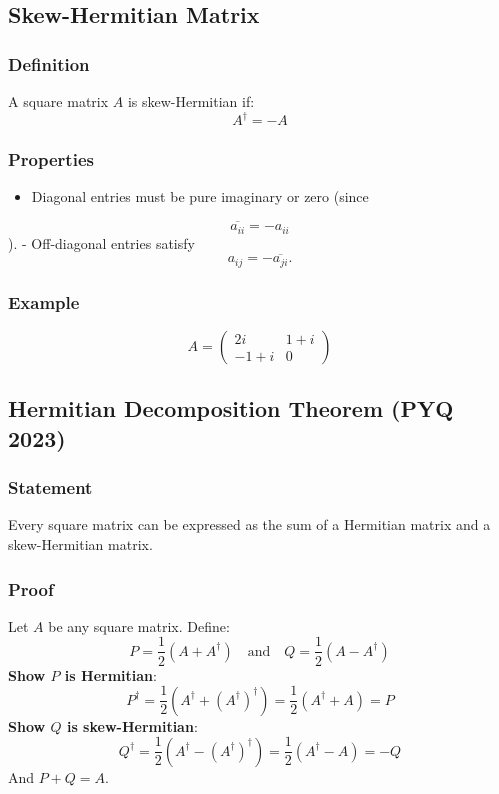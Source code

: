 \documentclass[
]{article}
\providecommand{\tightlist}{%
  \setlength{\itemsep}{0pt}\setlength{\parskip}{0pt}}
\begin{document}
\subsection{Skew-Hermitian Matrix}\label{skew-hermitian-matrix}

\subsubsection{Definition}\label{definition-9}

A square matrix \(A\) is skew-Hermitian if:
\[
A^\dagger = -A
\]
\subsubsection{Properties}\label{properties-2}

\begin{itemize}
\tightlist
\item
  Diagonal entries must be pure imaginary or zero (since
\end{itemize}
\[
\overline{a_{ii}} = -a_{ii}
\]
). - Off-diagonal entries satisfy
\[
a_{ij} = -\overline{a_{ji}}.
\]
\subsubsection{Example}\label{example-3}
\[
A =
\begin{pmatrix}
2i & 1+i \\
-1+i & 0
\end{pmatrix}
\]

\subsection{Hermitian Decomposition Theorem (PYQ
2023)}\label{hermitian-decomposition-theorem-pyq-2023}

\subsubsection{Statement}\label{statement-2}

Every square matrix can be expressed as the sum of a Hermitian matrix
and a skew-Hermitian matrix.

\subsubsection{Proof}\label{proof-2}

Let \(A\) be any square matrix. Define:
\[
P = \frac{1}{2}(A + A^\dagger) \quad \text{and} \quad Q = \frac{1}{2}(A - A^\dagger)
\]
\textbf{Show \(P\) is Hermitian}:
\[
P^\dagger = \frac{1}{2}(A^\dagger + (A^\dagger)^\dagger) = \frac{1}{2}(A^\dagger + A) = P
\]
\textbf{Show \(Q\) is skew-Hermitian}:
\[
Q^\dagger = \frac{1}{2}(A^\dagger - (A^\dagger)^\dagger) = \frac{1}{2}(A^\dagger - A) = -Q
\]
And \(P + Q = A\).
\end{document}
